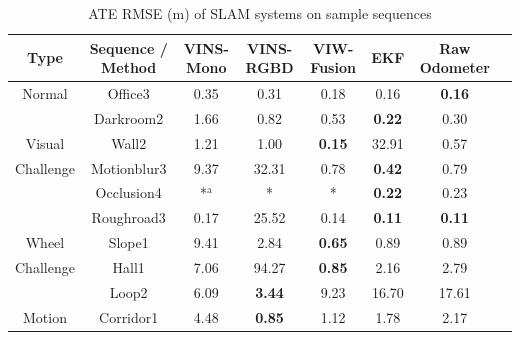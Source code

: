 \documentclass[conference]{IEEEtran}
\begin{document}
	\begin{table}[h]\scriptsize
		\caption{ ATE RMSE (m) of SLAM systems on sample sequences}
		\label{ate rmse tab}
		\centering
		\begin{tabular}{cccccccc}
			\hline
			{ Type} &{ Sequence / Method} & {VINS-Mono \cite{qin2018vins}} & {VINS-RGBD \cite{shan2019rgbd}}  & {VIW-Fusion \cite{Tingda2022VIW}}  & {EKF \cite{ribeiro2004kalman}} & {Raw Odometer}\\
			\hline
			
			{Normal}&{Office3}&  {0.35}  & {0.31}  & {0.18}  & {0.16} & {\textbf{0.16}}  \\
			\hline

			

			
			{}&{Darkroom2} & {1.66}  & {0.82}  & {0.53}  & {\textbf{0.22}} & {0.30}  \\
		
			


			

			{Visual}&{Wall2} & {1.21}  & {1.00}  & {\textbf{0.15}}  & {32.91} & {0.57} 
			\\
			
			{Challenge}&{Motionblur3} & {9.37}  & {32.31}  & {0.78}  & {\textbf{0.42}} & {0.79}  \\	
			{}&{Occlusion4}& {*$^{\mathrm{a}}$}  & {*}  & {*}  & {\textbf{0.22}} & {0.23}  \\
						
			\hline
			{}&{Roughroad3}&  {0.17}  & {25.52}  & {0.14}  & {\textbf{0.11}} & {\textbf{0.11}}  \\

			{Wheel}&{Slope1}&  {9.41}  & {2.84}  & {\textbf{0.65}}  & {0.89} & {0.89}  \\			
			
			
			{Challenge}&{Hall1}&  {7.06}  & {94.27}  & {\textbf{0.85}}  & {2.16} & {2.79}  \\

		

			{}&{Loop2}&  {6.09}  & {\textbf{3.44}}  & {9.23}  & {16.70} & {17.61}  \\
			\hline
			
			

			
			{Motion}&{Corridor1} &  {4.48}  & {\textbf{0.85}}  & {1.12}  & {1.78} & {2.17} \\
			


\end{tabular}
\end{table}
\end{document}
